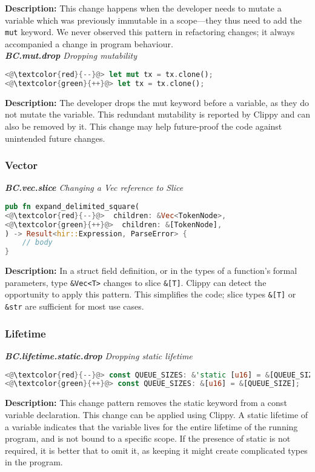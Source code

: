 \noindent\textbf{Description:} This change happens when the developer needs to mutate a variable which was previously immutable in a scope---they thus need to add the \verb+mut+ keyword. We never observed this pattern in refactoring changes; it always accompanied a change in program behaviour. \\

\noindent\textit{\textbf{BC.mut.drop} Dropping mutability}

\begin{lstlisting}[language=Rust, style=colouredRust]
<@\textcolor{red}{--}@> let mut tx = tx.clone();
<@\textcolor{green}{++}@> let tx = tx.clone();
\end{lstlisting}

\noindent\textbf{Description:} The developer drops the mut keyword before a variable, as they do not mutate the variable. This redundant mutability is reported by Clippy and can also be removed by it. This change may help future-proof the code against unintended future changes.

\subsubsection{Vector}

\noindent\textit{\textbf{BC.vec.slice} Changing a Vec reference to Slice}

\begin{lstlisting}[language=Rust, style=colouredRust]
pub fn expand_delimited_square(
<@\textcolor{red}{--}@>  children: &Vec<TokenNode>,
<@\textcolor{green}{++}@>  children: &[TokenNode],
) -> Result<hir::Expression, ParseError> {
    // body
}
\end{lstlisting}
\noindent\textbf{Description:} In a struct field definition, or in the types of a function's formal parameters, type \verb+&Vec<T>+ changes to slice \verb+&[T]+. Clippy can detect the opportunity to apply this pattern. This simplifies the code; slice types \verb+&[T]+ or \verb+&str+ are sufficient for most use cases. 

\subsubsection{Lifetime}
\noindent\textit{\textbf{BC.lifetime.static.drop} Dropping static lifetime}

\begin{lstlisting}[language=Rust, style=colouredRust]
<@\textcolor{red}{--}@> const QUEUE_SIZES: &'static [u16] = &[QUEUE_SIZE];
<@\textcolor{green}{++}@> const QUEUE_SIZES: &[u16] = &[QUEUE_SIZE];

\end{lstlisting}

\noindent\textbf{Description:} This change pattern removes the static keyword from a const variable declaration. This change can be applied using Clippy. A static lifetime of a variable indicates that the variable lives for the entire lifetime of the running program, and is not bound to a specific scope. If the presence of static is not required, it is better that to omit it, as keeping it might create complicated types in the program.

